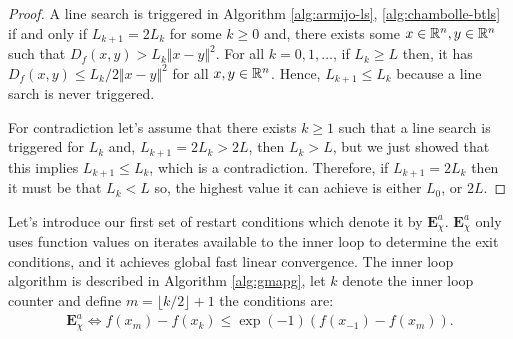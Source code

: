 \documentclass[12pt]{report}
\begin{document}
        \begin{proof}
            A line search is triggered in Algorithm \ref{alg:armijo-ls}, \ref{alg:chambolle-btls} if and only if $L_{k + 1} = 2L_{k}$ for some $k \ge 0$ and, there exists some $x\in \mathbb R^n, y \in \mathbb R^n$ such that $D_f(x, y) > L_k\Vert x - y \Vert^2$. 
            For all $k = 0, 1, \ldots $, if $L_k \ge L$ then, it has $D_f(x, y) \le L_k/2\Vert x - y\Vert^2$ for all $x, y \in \mathbb R^n$. 
            Hence, $L_{k + 1} \le L_k$ because a line sarch is never triggered. 
            \par
            For contradiction let's assume that there exists $k \ge 1$ such that a line search is triggered for $L_k$ and, $L_{k + 1} = 2L_{k} > 2L$, then $L_k > L$, but we just showed that this implies $L_{k + 1} \le L_k$, which is a contradiction. 
            Therefore, if $L_{k + 1} = 2L_k$ then it must be that $L_k < L$ so, the highest value it can achieve is either $L_0$, or $2L$. 
        \end{proof}
        \par
        Let's introduce our first set of restart conditions which denote it by $\mathbf E_{\chi}^{a}$. 
        $\mathbf E_{\chi}^{a}$ only uses function values on iterates available to the inner loop to determine the exit conditions, and it achieves global fast linear convergence. 
        The inner loop algorithm is described in Algorithm \ref{alg:gmapg}, let $k$ denote the inner loop counter and define $m = \lfloor k/2 \rfloor + 1$ the conditions are: 
        \begin{align}\label{ineq:rgmapg-exit-cond}
            \mathbf E_{\chi}^a \iff 
            f(x_m) - f(x_k) \le \exp(-1)(f(x_{-1}) - f(x_m)). 
        \end{align}
\end{document}
